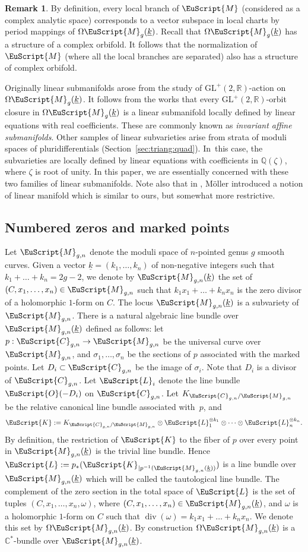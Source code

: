 \documentclass[10pt]{amsart}
\let\mathcal\EuScript
\DeclareMathOperator{\Div}{div}
\theoremstyle{plain}
\theoremstyle{definition}
\newtheorem{Remark}[Theorem]{Remark}
\newcommand{\R}{\mathbb{R}}
\def\C{\mathbb{C}}
\newcommand{\Q}{\mathbb{Q}}
\newcommand{\Ccal}{\mathcal{C}}
\newcommand{\Kcal}{\mathcal{K}}
\newcommand{\Lcal}{\mathcal{L}}
\newcommand{\Mcal}{\mathcal{M}}
\newcommand{\Ocal}{\mathcal{O}}
\newcommand{\cM}{\mathcal{M}}
\newcommand{\GL}{\mathrm{GL}}
\let\omg\omega
\let\ul\underline
\newcommand{\trate}{\Omega\Mcal_{g}(\ul{k})}
\begin{document}
\begin{Remark}\label{rk:lin:subman:orbifold}
By definition, every local branch of $\cM$ (considered as a complex analytic space) corresponds to a vector subspace in local charts by period mappings of $\trate$.
Recall that $\trate$ has a structure of a complex orbifold. It follows that the normalization of $\cM$ (where all the local branches are separated) also has a structure of complex orbifold.
\end{Remark}

Originally linear submanifolds arose from the study of $\GL^+(2,\R)$-action on $\trate$. It follows from the works \cite{EM18, EMM15, Filip16} that every $\GL^+(2,\R)$-orbit closure in $\trate$ is a linear submanifold locally defined by linear equations with real coefficients. These are commonly known as \emph{invariant affine submanifolds}. Other samples of linear subvarieties arise from strata of moduli spaces of pluri\-differentials (\cf Section~\ref{sec:triang:quad}). In~this case, the subvarieties are locally defined by linear equations with coefficients in $\Q(\zeta)$, where $\zeta$ is root of unity. In this paper, we are essentially concerned with these two families of linear submanifolds.
Note also that in \cite[Def.\,6.4]{Moller08}, Möller introduced a notion of linear manifold which is similar to ours, but somewhat more restrictive.

\subsection{Numbered zeros and marked points}\label{subsec:numb:zeros}
Let $\cM_{g,n}$ denote the moduli space of $n$-pointed genus $g$ smooth curves. Given a vector $\ul{k}=(k_1,\dots,k_n)$ of non-negative integers such that $k_1+\dots+k_n=2g-2$, we denote by $\cM_{g,n}(\ul{k})$ the set of $(C,x_1,\dots,x_n) \in \cM_{g,n}$ such that $k_1x_1+\dots+k_nx_n$ is the zero divisor of a holomorphic $1$-form on $C$. The locus $\cM_{g,n}(\ul{k})$ is a subvariety of $\cM_{g,n}$. There is a natural algebraic line bundle over $\cM_{g,n}(\ul{k})$ defined as follows: let $p:\Ccal_{g,n}\to \cM_{g,n}$ be the universal curve over $\cM_{g,n}$, and $\sigma_1,\dots,\sigma_n$ be the sections of $p$ associated with the marked points. Let $D_i\subset \Ccal_{g,n}$ be the image of $\sigma_i$. Note that $D_i$ is a divisor of $\Ccal_{g,n}$.
Let $\Lcal_i$ denote the line bundle $\Ocal(-D_i)$ on $\Ccal_{g,n}$. Let $K_{\Ccal_{g,n}/\cM_{g,n}}$ be the relative canonical line bundle associated with~$p$, and
\[
\Kcal:=K_{\Ccal_{g,n}/\cM_{g,n}}\otimes\Lcal_1^{\otimes k_1}\otimes\dots\otimes\Lcal_n^{\otimes k_n}.
\]
By definition, the restriction of $\Kcal$ to the fiber of $p$ over every point in $\cM_{g,n}(\ul{k})$ is the trivial line bundle. Hence $\Lcal:=p_*(\Kcal_{|p^{-1}(\cM_{g,n}(\ul{k}))})$ is a line bundle over $\cM_{g,n}(\ul{k})$ which will be called the tautological line bundle.
The complement of the zero section in the total space of $\Lcal$ is the set of tuples $(C,x_1,\dots,x_n,\omg)$, where $(C,x_1,\dots,x_n) \in\nobreak \cM_{g,n}(\ul{k})$, and $\omg$ is a holomorphic $1$-form on $C$ such that $\Div(\omg)=k_1x_1+\dots+k_nx_n$. We denote this set by $\Omega\cM_{g,n}(\ul{k})$. By construction $\Omega\cM_{g,n}(\ul{k})$ is a $\C^*$-bundle over $\cM_{g,n}(\ul{k})$.
\end{document}
